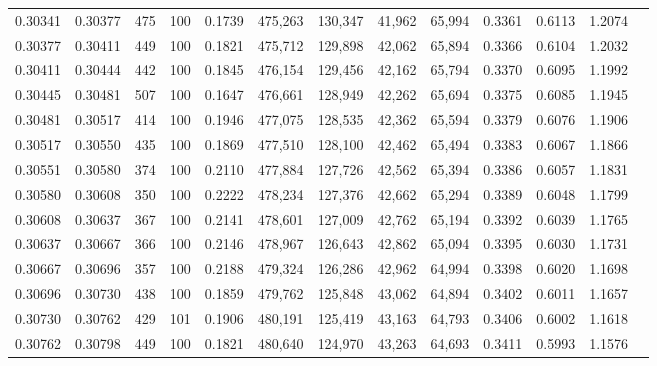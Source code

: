 \begin{tabular}{rrrrrrrrrrrrr}
0.30341 & 0.30377 &   475 & 100 &                                     0.1739 & 475,263 & 130,347 &  41,962 &  65,994 & 0.3361 & 0.6113 & 1.2074 \\
0.30377 & 0.30411 &   449 & 100 &                                     0.1821 & 475,712 & 129,898 &  42,062 &  65,894 & 0.3366 & 0.6104 & 1.2032 \\
0.30411 & 0.30444 &   442 & 100 &                                     0.1845 & 476,154 & 129,456 &  42,162 &  65,794 & 0.3370 & 0.6095 & 1.1992 \\
0.30445 & 0.30481 &   507 & 100 &                                     0.1647 & 476,661 & 128,949 &  42,262 &  65,694 & 0.3375 & 0.6085 & 1.1945 \\
0.30481 & 0.30517 &   414 & 100 &                                     0.1946 & 477,075 & 128,535 &  42,362 &  65,594 & 0.3379 & 0.6076 & 1.1906 \\
0.30517 & 0.30550 &   435 & 100 &                                     0.1869 & 477,510 & 128,100 &  42,462 &  65,494 & 0.3383 & 0.6067 & 1.1866 \\
0.30551 & 0.30580 &   374 & 100 &                                     0.2110 & 477,884 & 127,726 &  42,562 &  65,394 & 0.3386 & 0.6057 & 1.1831 \\
0.30580 & 0.30608 &   350 & 100 &                                     0.2222 & 478,234 & 127,376 &  42,662 &  65,294 & 0.3389 & 0.6048 & 1.1799 \\
0.30608 & 0.30637 &   367 & 100 &                                     0.2141 & 478,601 & 127,009 &  42,762 &  65,194 & 0.3392 & 0.6039 & 1.1765 \\
0.30637 & 0.30667 &   366 & 100 &                                     0.2146 & 478,967 & 126,643 &  42,862 &  65,094 & 0.3395 & 0.6030 & 1.1731 \\
0.30667 & 0.30696 &   357 & 100 &                                     0.2188 & 479,324 & 126,286 &  42,962 &  64,994 & 0.3398 & 0.6020 & 1.1698 \\
0.30696 & 0.30730 &   438 & 100 &                                     0.1859 & 479,762 & 125,848 &  43,062 &  64,894 & 0.3402 & 0.6011 & 1.1657 \\
0.30730 & 0.30762 &   429 & 101 &                                     0.1906 & 480,191 & 125,419 &  43,163 &  64,793 & 0.3406 & 0.6002 & 1.1618 \\
0.30762 & 0.30798 &   449 & 100 &                                     0.1821 & 480,640 & 124,970 &  43,263 &  64,693 & 0.3411 & 0.5993 & 1.1576 \\

\end{tabular}
